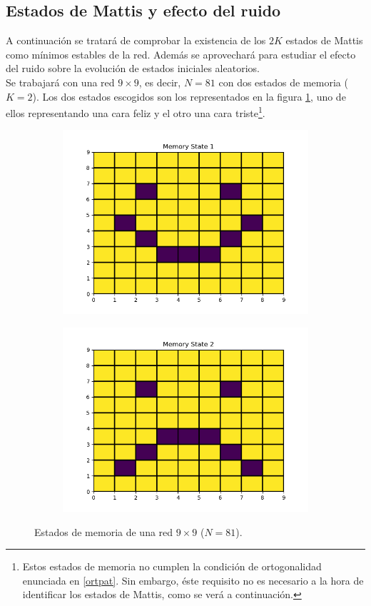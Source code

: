 \documentclass[titlepage,12pt]{article}
\numberwithin{equation}{section}
\begin{document}
	\subsection{Estados de Mattis y efecto del ruido}
	A continuación se tratará de comprobar la existencia de los $2K$ estados de Mattis como mínimos estables de la red. Además se aprovechará para estudiar el efecto del ruido sobre la evolución de estados iniciales aleatorios.
	\\
	Se trabajará con una red $9 \times 9$, es decir, $N = 81$ con dos estados de memoria ($K = 2$). Los dos estados escogidos son los representados en la figura \ref{faces}, uno de ellos representando una cara feliz y el otro una cara triste\footnote{Estos estados de memoria no cumplen la condición de ortogonalidad enunciada en \eqref{ortpat}. Sin embargo, éste requisito no es necesario a la hora de identificar los estados de Mattis, como se verá a continuación.}.
	\begin{figure}
	    \centering
	    \begin{subfigure}{.5\textwidth}
	    \centering
	    \includegraphics[width=.75\linewidth]{state_9x9_1.png}
	    \end{subfigure}%
	    \begin{subfigure}{.5\linewidth}
	    \centering
	    \includegraphics[width=.75\linewidth]{state_9x9_2.png}
	    \end{subfigure}%
	    \caption{Estados de memoria de una red $9 \times 9$ ($N = 81$).}
	    \label{faces}
	\end{figure}
\end{document}
